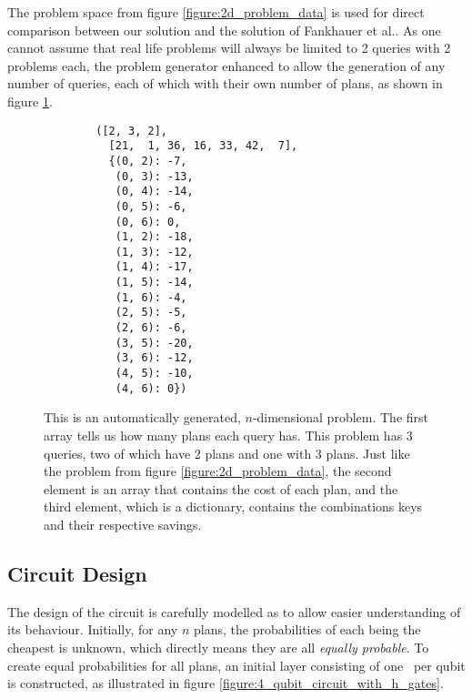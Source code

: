 The problem space from figure \ref{figure:2d_problem_data} is used for direct comparison between our solution and the solution of Fankhauer et al.\cite{fankhauser_multiple_2021}. As one cannot assume that real life problems will always be limited to 2 queries with 2 problems each, the problem generator enhanced to allow the generation of any number of queries, each of which with their own number of plans, as shown in figure \ref{figure:nd_problem_data}.

\begin{figure}[!h]
    \centering
    \begin{verbatim}
        ([2, 3, 2],
          [21,  1, 36, 16, 33, 42,  7],
          {(0, 2): -7,
           (0, 3): -13,
           (0, 4): -14,
           (0, 5): -6,
           (0, 6): 0,
           (1, 2): -18,
           (1, 3): -12,
           (1, 4): -17,
           (1, 5): -14,
           (1, 6): -4,
           (2, 5): -5,
           (2, 6): -6,
           (3, 5): -20,
           (3, 6): -12,
           (4, 5): -10,
           (4, 6): 0})
    \end{verbatim}
    \caption{This is an automatically generated, $n$-dimensional problem. The first array tells us how many plans each query has. This problem has 3 queries, two of which have 2 plans and one with 3 plans. Just like the problem from figure \ref{figure:2d_problem_data}, the second element is an array that contains the cost of each plan, and the third element, which is a dictionary, contains the combinations keys and their respective savings.}
    \label{figure:nd_problem_data}
\end{figure}


\newpage

\subsection{Circuit Design}

The design of the circuit is carefully modelled as to allow easier understanding of its behaviour. Initially, for any $n$ plans, the probabilities of each being the cheapest is unknown, which directly means they are all \emph{equally probable}. To create equal probabilities for all plans, an initial layer consisting of one \hgate\ per qubit is constructed, as illustrated in figure \ref{figure:4_qubit_circuit_with_h_gates}.

